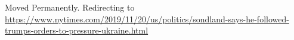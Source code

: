 Moved Permanently. Redirecting to
\url{https://www.nytimes.com/2019/11/20/us/politics/sondland-says-he-followed-trumps-orders-to-pressure-ukraine.html}
